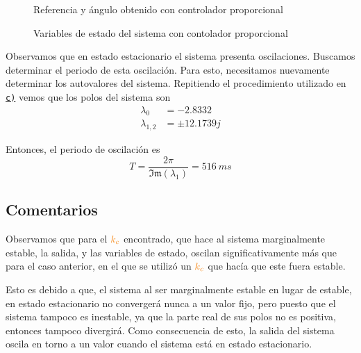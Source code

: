 \begin{figure}[h]
  \centering
  
  \caption{Referencia y ángulo obtenido con controlador proporcional}\label{fig:psi-prop-marge}
\end{figure}

\begin{figure}[h]
  \centering
  
  \caption{Variables de estado del sistema con contolador proporcional}\label{fig:estado-prop-marge}
\end{figure}

\FloatBarrier

Observamos que en estado estacionario el sistema presenta oscilaciones. Buscamos
determinar el periodo de esta oscilación. Para esto, necesitamos nuevamente determinar
los autovalores del sistema. Repitiendo el procedimiento utilizado en \hyperref[pregunta-c]{\texttt{c)}}
vemos que los polos del sistema son
\begin{align*}
    \lambda_{0} &= -2.8332 \\
    \lambda_{1,2} &= \pm 12.1739j
\end{align*}

Entonces, el periodo de oscilación es
\begin{equation}
    T = \frac{2\pi}{\mathfrak{Im}(\lambda_{1})} = 516\ \unit{ms}
\end{equation}

\subsection{Comentarios}

Observamos que para el $\nara{k_{c}}$ encontrado, que hace al sistema marginalmente
estable, la salida, y las variables de estado, oscilan significativamente más que
para el caso anterior, en el que se utilizó un $\nara{k_{c}}$ que hacía que este
fuera estable.

Esto es debido a que, el sistema al ser marginalmente estable en lugar de estable,
en estado estacionario no convergerá nunca a un valor fijo, pero puesto que el
sistema tampoco es inestable, ya que la parte real de sus polos no es positiva,
entonces tampoco divergirá. Como consecuencia de esto, la salida del sistema
oscila en torno a un valor cuando el sistema está en estado estacionario.
